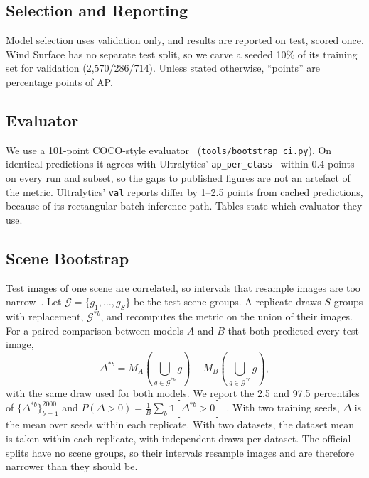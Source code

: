 \subsection{Selection and Reporting}
Model selection uses validation only, and results are reported on test, scored once. Wind Surface has no separate test split, so we carve a seeded 10\% of its training set for validation (2{,}570/286/714). Unless stated otherwise, ``points'' are percentage points of AP.

\subsection{Evaluator}
We use a 101-point COCO-style evaluator~\cite{coco,pascal} (\texttt{tools/bootstrap\_ci.py}). On identical predictions it agrees with Ultralytics' \texttt{ap\_per\_class}~\cite{ultralytics} within 0.4 points on every run and subset, so the gaps to published figures are not an artefact of the metric. Ultralytics' \texttt{val} reports differ by 1--2.5 points from cached predictions, because of its rectangular-batch inference path. Tables state which evaluator they use.

\subsection{Scene Bootstrap}
Test images of one scene are correlated, so intervals that resample images are too narrow~\cite{fieldwelsh}. Let $\mathcal{G}=\{g_1,\dots,g_S\}$ be the test scene groups. A replicate draws $S$ groups with replacement, $\mathcal{G}^{*b}$, and recomputes the metric on the union of their images. For a paired comparison between models $A$ and $B$ that both predicted every test image,
\begin{equation}
\Delta^{*b} = M_A\!\left(\textstyle\bigcup_{g\in\mathcal{G}^{*b}} g\right) - M_B\!\left(\textstyle\bigcup_{g\in\mathcal{G}^{*b}} g\right),
\label{eq:bootstrap}
\end{equation}
with the same draw used for both models. We report the 2.5 and 97.5 percentiles of $\{\Delta^{*b}\}_{b=1}^{2000}$ and $P(\Delta>0)=\frac{1}{B}\sum_b\mathbb{1}[\Delta^{*b}>0]$~\cite{efron}. With two training seeds, $\Delta$ is the mean over seeds within each replicate. With two datasets, the dataset mean is taken within each replicate, with independent draws per dataset. The official splits have no scene groups, so their intervals resample images and are therefore narrower than they should be.

